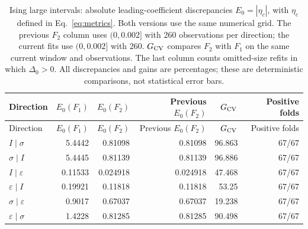 \begingroup\setlength{\tabcolsep}{3pt}
\begin{longtable}{lrrrrr}
\caption{Ising large intervals: absolute leading-coefficient discrepancies $E_0=|\eta_c|$, with $\eta_c$ defined in Eq.~\eqref{eq:metrics}. Both versions use the same numerical grid. The previous $F_2$ column uses $(0,0.002]$ with 260 observations per direction; the current fits use $(0,0.002]$ with 260. $G_{\rm CV}$ compares $F_2$ with $F_1$ on the same current window and observations. The last column counts omitted-size refits in which $\Delta_0>0$. All discrepancies and gains are percentages; these are deterministic comparisons, not statistical error bars.}
\label{tab:common-large-ising}\\\toprule
Direction & $E_0(F_1)$ & $E_0(F_2)$ & Previous $E_0(F_2)$ & $G_{\rm CV}$ & Positive folds\\\midrule
\endfirsthead
\toprule
Direction & $E_0(F_1)$ & $E_0(F_2)$ & Previous $E_0(F_2)$ & $G_{\rm CV}$ & Positive folds\\\midrule
\endhead
\bottomrule\endfoot
$I\mid \sigma$ & 5.4442 & 0.81098 & 0.81098 & 96.863 & 67/67\\
$\sigma\mid I$ & 5.4445 & 0.81139 & 0.81139 & 96.886 & 67/67\\
$I\mid \varepsilon$ & 0.11533 & 0.024918 & 0.024918 & 47.468 & 67/67\\
$\varepsilon\mid I$ & 0.19921 & 0.11818 & 0.11818 & 53.25 & 67/67\\
$\sigma\mid \varepsilon$ & 0.9017 & 0.67037 & 0.67037 & 19.238 & 67/67\\
$\varepsilon\mid \sigma$ & 1.4228 & 0.81285 & 0.81285 & 90.498 & 67/67\\
\end{longtable}
\endgroup
